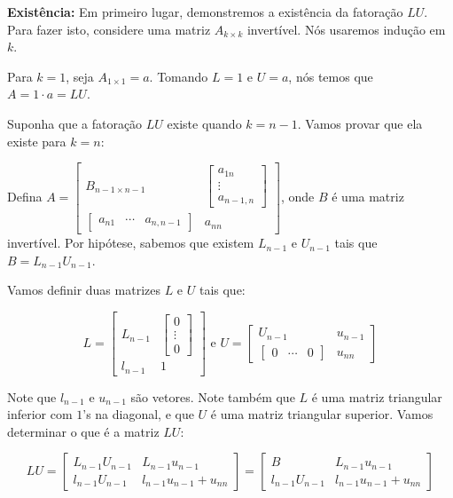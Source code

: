 \begin{Proof}
	\textbf{Existência:} Em primeiro lugar, demonstremos a existência da fatoração $LU$. Para fazer isto, considere uma matriz $A_{k\times k}$ invertível. Nós usaremos indução em $k$.
	
	Para $k = 1$, seja $A_{1\times 1} = a$. Tomando $L = 1$ e $U = a$, nós temos que $A = 1\cdot a = LU$.
	
	Suponha que a fatoração $LU$ existe quando $k = n - 1$. Vamos provar que ela existe para $k = n$:
	
	Defina $A = \begin{bmatrix}
		B_{n - 1 \times n - 1} & \begin{bmatrix}
			a_{1n} \\ \vdots \\ a_{n - 1, n}
		\end{bmatrix} \\
		\begin{bmatrix}
			a_{n1} & \cdots & a_{n, n - 1}
		\end{bmatrix} & a_{nn}
	\end{bmatrix}$, onde $B$ é uma matriz invertível. Por hipótese, sabemos que existem $L_{n - 1}$ e $U_{n - 1}$ tais que $B = L_{n - 1}U_{n - 1}$.
	
	Vamos definir duas matrizes $L$ e $U$ tais que:
	
	$$
	L = \begin{bmatrix}
		L_{n - 1} & \begin{bmatrix}
			0 \\ \vdots \\ 0
		\end{bmatrix} \\
		l_{n - 1} & 1
	\end{bmatrix} \text{ e } U = \begin{bmatrix}
		U_{n - 1} & u_{n - 1} \\
		\begin{bmatrix}
			0 & \cdots & 0
		\end{bmatrix} & u_{nn}
	\end{bmatrix}
	$$
	
	Note que $l_{n - 1}$ e $u_{n - 1}$ são vetores. Note também que $L$ é uma matriz triangular inferior com $1$'s na diagonal, e que $U$ é uma matriz triangular superior. Vamos determinar o que é a matriz $LU$:
	
	$$
	LU = \begin{bmatrix}
		L_{n - 1}U_{n - 1} & L_{n - 1}u_{n - 1} \\
		l_{n - 1}U_{n - 1} & l_{n - 1}u_{n - 1} + u_{nn}
	\end{bmatrix} = \begin{bmatrix}
		B & L_{n - 1}u_{n - 1} \\
		l_{n - 1}U_{n - 1} & l_{n - 1}u_{n - 1} + u_{nn}
	\end{bmatrix}
	$$
	

\end{Proof}
